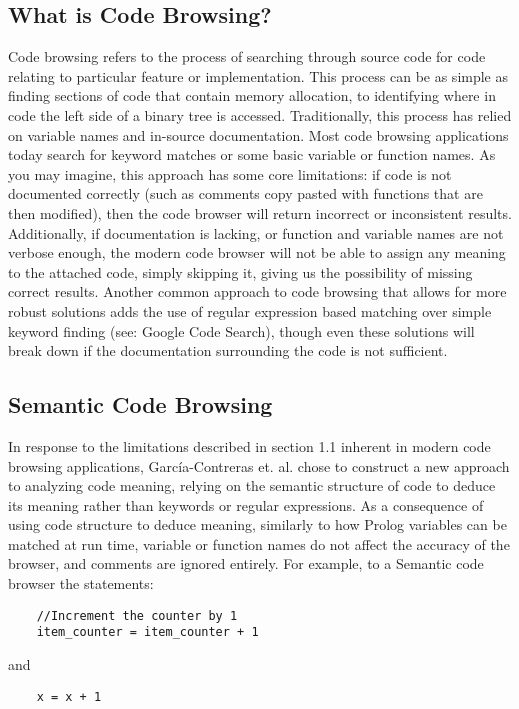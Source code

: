 \documentclass{article}
\begin{document}
\subsection{What is Code Browsing?}
Code browsing refers to the process of searching through source code for code relating to particular feature or implementation. This process can be as simple as finding sections of code that contain memory allocation, to identifying where in code the left side of a binary tree is accessed. Traditionally, this process has relied on variable names and in-source documentation. Most code browsing applications today search for keyword matches or some basic variable or function names. As you may imagine, this approach has some core limitations: if code is not documented correctly (such as comments copy pasted with functions that are then modified), then the code browser will return incorrect or inconsistent results. Additionally, if documentation is lacking, or function and variable names are not verbose enough, the modern code browser will not be able to assign any meaning to the attached code, simply skipping it, giving us the possibility of missing correct results. Another common approach to code browsing that allows for more robust solutions adds the use of regular expression based matching over simple keyword finding (see: Google Code Search), though even these solutions will break down if the documentation surrounding the code is not sufficient.

\subsection{Semantic Code Browsing}
In response to the limitations described in section 1.1 inherent in modern code browsing applications, García-Contreras et. al. chose to construct a new approach to analyzing code meaning, relying on the semantic structure of code to deduce its meaning rather than keywords or regular expressions. As a consequence of using code structure to deduce meaning, similarly to how Prolog variables can be matched at run time, variable or function names do not affect the accuracy of the browser, and comments are ignored entirely. For example, to a Semantic code browser the statements: 

\begin{verbatim}
    //Increment the counter by 1
    item_counter = item_counter + 1
\end{verbatim}

and

\begin{verbatim}
    x = x + 1
\end{verbatim}
\end{document}
